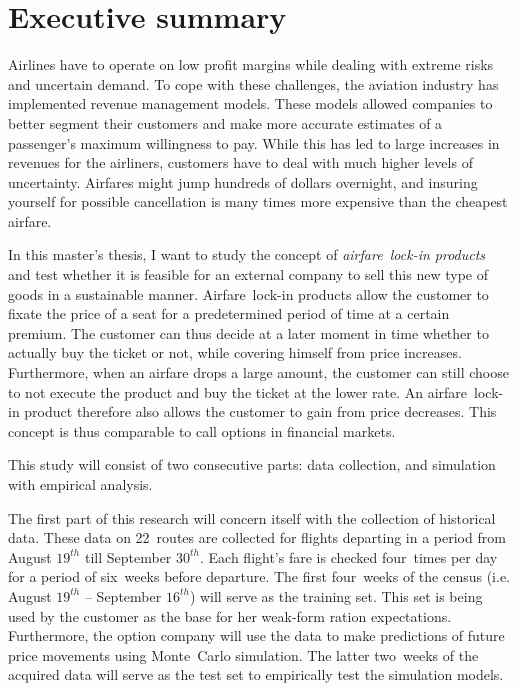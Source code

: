 \chapter{Executive summary}
Airlines have to operate on low profit margins while dealing with extreme risks and uncertain demand. To cope with these challenges, the aviation industry has implemented revenue management models. These models allowed companies to better segment their customers and make more accurate estimates of a passenger's maximum willingness to pay. While this has led to large increases in revenues for the airliners, customers have to deal with much higher levels of uncertainty. Airfares might jump hundreds of dollars overnight, and insuring yourself for possible cancellation is many times more expensive than the cheapest airfare.

In this master's thesis, I want to study the concept of \emph{airfare~lock-in products} and test whether it is feasible for an external company to sell this new type of goods in a sustainable manner. Airfare~lock-in products allow the customer to fixate the price of a seat for a predetermined period of time at a certain premium. The customer can thus decide at a later moment in time whether to actually buy the ticket or not, while covering himself from price increases. Furthermore, when an airfare drops a large amount, the customer can still choose to not execute the product and buy the ticket at the lower rate. An airfare~lock-in product therefore also allows the customer to gain from price decreases. This concept is thus comparable to call options in financial markets.

This study will consist of two consecutive parts: data collection, and simulation with empirical analysis.

The first part of this research will concern itself with the collection of historical data. These data on 22~routes are collected for flights departing in a period from August $19^{th}$ till September $30^{th}$. Each flight's fare is checked four~times per day for a period of six~weeks before departure. The first four~weeks of the census (i.e. August $19^{th}$ -- September $16^{th}$) will serve as the training set. This set is being used by the customer as the base for her weak-form ration expectations. Furthermore, the option company will use the data to make predictions of future price movements using Monte~Carlo simulation. The latter two~weeks of the acquired data will serve as the test set to empirically test the simulation models.

